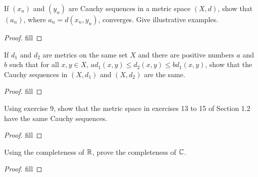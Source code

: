 \begin{exercise}{6}
If $(x_n)$ and $(y_n)$ are Cauchy sequences in a metric space $(X,d)$, show that $(a_n)$, where $a_n=d(x_n,y_n)$, converges. Give illustrative examples.
\end{exercise}
\begin{proof}
fill
\end{proof}

\begin{exercise}{8}
If $d_1$ and $d_2$ are metrics on the same set $X$ and there are positive numbers $a$ and $b$ such that for all $x,y\in X$, $ad_1(x,y)\leq d_2(x,y)\leq bd_1(x,y)$, show that the Cauchy sequences in $(X,d_1)$ and $(X,d_2)$ are the same.
\end{exercise}
\begin{proof}
fill
\end{proof}

\begin{exercise}{9}
Using exercise 9, show that the metric space in exercises 13 to 15 of Section 1.2 have the same Cauchy sequences.
\end{exercise}
\begin{proof}
fill
\end{proof}

\begin{exercise}{10}
Using the completeness of $\mathbb{R}$, prove the completeness of $\mathbb{C}$.
\end{exercise}
\begin{proof}
fill
\end{proof}